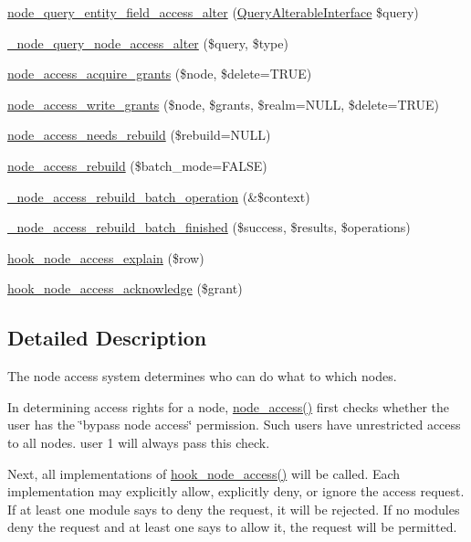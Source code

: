 \begin{DoxyCompactItemize}
\item 
\hyperlink{group__node__access_gacd4162ac9ee2d2147d5212fd5e7a7319}{node\_\-query\_\-entity\_\-field\_\-access\_\-alter} (\hyperlink{interfaceQueryAlterableInterface}{QueryAlterableInterface} \$query)
\item 
\hyperlink{group__node__access_ga5f4838d9b5cac9f3bee9a26f39e80691}{\_\-node\_\-query\_\-node\_\-access\_\-alter} (\$query, \$type)
\item 
\hyperlink{group__node__access_ga6fbbc13a4098f72663c0a67f81100f67}{node\_\-access\_\-acquire\_\-grants} (\$node, \$delete=TRUE)
\item 
\hyperlink{group__node__access_ga735fbb5dfa05cc1aed121655a1694909}{node\_\-access\_\-write\_\-grants} (\$node, \$grants, \$realm=NULL, \$delete=TRUE)
\item 
\hyperlink{group__node__access_ga895d95595168709334c4eca1472c6d23}{node\_\-access\_\-needs\_\-rebuild} (\$rebuild=NULL)
\item 
\hyperlink{group__node__access_gaf04007aedfc3afbe074b2fe4065ab618}{node\_\-access\_\-rebuild} (\$batch\_\-mode=FALSE)
\item 
\hyperlink{group__node__access_ga2b720b31a5b728b16c357ab995deb5d5}{\_\-node\_\-access\_\-rebuild\_\-batch\_\-operation} (\&\$context)
\item 
\hyperlink{group__node__access_gaa7feee934ce635e386628b570901ff38}{\_\-node\_\-access\_\-rebuild\_\-batch\_\-finished} (\$success, \$results, \$operations)
\item 
\hyperlink{group__node__access_gaeedf3adea0813fb3631f26d0de83a68d}{hook\_\-node\_\-access\_\-explain} (\$row)
\item 
\hyperlink{group__node__access_gac5a197ac3564b867c2921fb496063ae6}{hook\_\-node\_\-access\_\-acknowledge} (\$grant)
\end{DoxyCompactItemize}


\subsection{Detailed Description}
The node access system determines who can do what to which nodes.

In determining access rights for a node, \hyperlink{group__node__access_ga46f0f1ed812befada8f8e7d1b8c352db}{node\_\-access()} first checks whether the user has the \char`\"{}bypass node access\char`\"{} permission. Such users have unrestricted access to all nodes. user 1 will always pass this check.

Next, all implementations of \hyperlink{group__node__access_ga75a280ea1fbe0fb6ca034f8aad06d58d}{hook\_\-node\_\-access()} will be called. Each implementation may explicitly allow, explicitly deny, or ignore the access request. If at least one module says to deny the request, it will be rejected. If no modules deny the request and at least one says to allow it, the request will be permitted.

